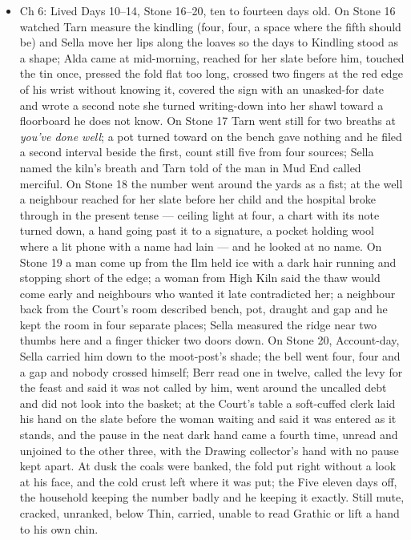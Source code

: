 \documentclass{design/chronicle}
\begin{document}
{\begin{itemize}[leftmargin=1.4em,itemsep=1pt,topsep=3pt,parsep=0pt]
\item Ch 6: Lived Days 10--14, Stone 16--20, ten to fourteen days old. On Stone 16 watched Tarn measure the kindling (four, four, a space where the fifth should be) and Sella move her lips along the loaves so the days to Kindling stood as a shape; Alda came at mid-morning, reached for her slate before him, touched the tin once, pressed the fold flat too long, crossed two fingers at the red edge of his wrist without knowing it, covered the sign with an unasked-for date and wrote a second note she turned writing-down into her shawl toward a floorboard he does not know. On Stone 17 Tarn went still for two breaths at \emph{you’ve done well}; a pot turned toward on the bench gave nothing and he filed a second interval beside the first, count still five from four sources; Sella named the kiln’s breath and Tarn told of the man in Mud End called merciful. On Stone 18 the number went around the yards as a fist; at the well a neighbour reached for her slate before her child and the hospital broke through in the present tense --- ceiling light at four, a chart with its note turned down, a hand going past it to a signature, a pocket holding wool where a lit phone with a name had lain --- and he looked at no name. On Stone 19 a man come up from the Ilm held ice with a dark hair running and stopping short of the edge; a woman from High Kiln said the thaw would come early and neighbours who wanted it late contradicted her; a neighbour back from the Court’s room described bench, pot, draught and gap and he kept the room in four separate places; Sella measured the ridge near two thumbs here and a finger thicker two doors down. On Stone 20, Account-day, Sella carried him down to the moot-post’s shade; the bell went four, four and a gap and nobody crossed himself; Berr read one in twelve, called the levy for the feast and said it was not called by him, went around the uncalled debt and did not look into the basket; at the Court’s table a soft-cuffed clerk laid his hand on the slate before the woman waiting and said it was entered as it stands, and the pause in the neat dark hand came a fourth time, unread and unjoined to the other three, with the Drawing collector’s hand with no pause kept apart. At dusk the coals were banked, the fold put right without a look at his face, and the cold crust left where it was put; the Five eleven days off, the household keeping the number badly and he keeping it exactly. Still mute, cracked, unranked, below Thin, carried, unable to read Grathic or lift a hand to his own chin.


\end{itemize}}
\end{document}
